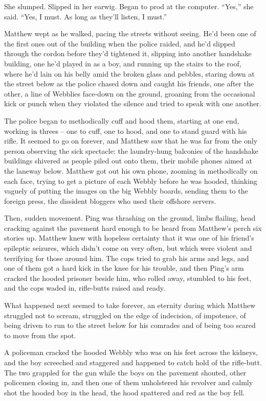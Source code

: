 She slumped. Slipped in her earwig. Began to prod at the computer.
``Yes,'' she said. ``Yes, I must. As long as they'll listen, I must.''

\tb

Matthew wept as he walked, pacing the streets without seeing. He'd
been one of the first ones out of the building when the police
raided, and he'd slipped through the cordon before they'd tightened
it, slipping into another handshake building, one he'd played in as
a boy, and running up the stairs to the roof, where he'd lain on
his belly amid the broken glass and pebbles, staring down at the
street below as the police chased down and caught his friends, one
after the other, a line of Webblies face-down on the ground,
groaning from the occasional kick or punch when they violated the
silence and tried to speak with one another.

The police began to methodically cuff and hood them, starting at
one end, working in threes -- one to cuff, one to hood, and one to
stand guard with his rifle. It seemed to go on forever, and Matthew
saw that he was far from the only person observing the sick
spectacle: the laundry-hung balconies of the handshake buildings
shivered as people piled out onto them, their mobile phones aimed
at the laneway below. Matthew got out his own phone, zooming in
methodically on each face, trying to get a picture of each Webbly
before he was hooded, thinking vaguely of putting the images on the
big Webbly boards, sending them to the foreign press, the dissident
bloggers who used their offshore servers.

Then, sudden movement. Ping was thrashing on the ground, limbs
flailing, head cracking against the pavement hard enough to be
heard from Matthew's perch six stories up. Matthew knew with
hopeless certainty that it was one of his friend's epileptic
seizures, which didn't come on very often, but which were violent
and terrifying for those around him. The cops tried to grab his
arms and legs, and one of them got a hard kick in the knee for his
trouble, and then Ping's arm cracked the hooded prisoner beside
him, who rolled away, stumbled to his feet, and the cops waded in,
rifle-butts raised and ready.

What happened next seemed to take forever, an eternity during which
Matthew struggled not to scream, struggled on the edge of
indecision, of impotence, of being driven to run to the street
below for his comrades and of being too scared to move from the
spot.

A policeman cracked the hooded Webbly who was on his feet across
the kidneys, and the boy screeched and staggered and happened to
catch hold of the rifle-butt. The two grappled for the gun while
the boys on the pavement shouted, other policemen closing in, and
then one of them unholstered his revolver and calmly shot the
hooded boy in the head, the hood spattered and red as the boy
fell.

